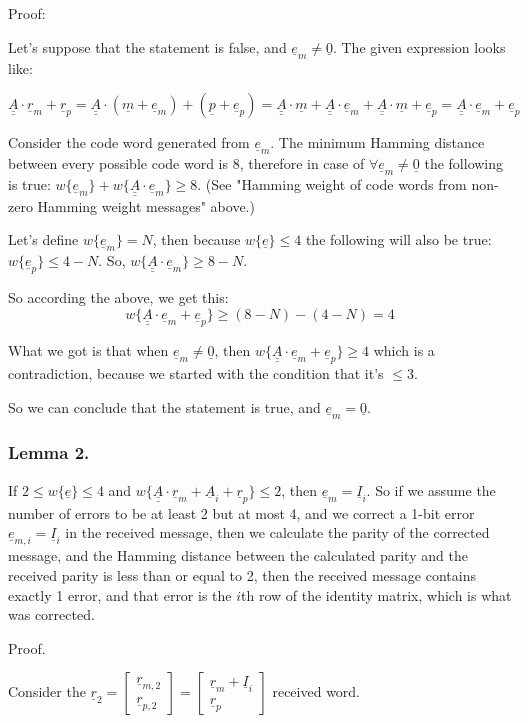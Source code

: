 \documentclass[11pt,a4paper,oneside]{report}             %
\def\doubleunderline#1{\underline{\underline{#1}}}
\def\dul#1{\doubleunderline{#1}}
\def\ul#1{\underline{#1}}
\newcommand{\vect}[2]{\begin{bmatrix} #1 \\ #2 \end{bmatrix}}
\begin{document}
Proof:

Let's suppose that the statement is false, and $\ul{e}_m \neq \ul{0}$.
The given expression looks like:

\[
    \dul{A} \cdot \ul{r}_m + \ul{r}_p =
    \dul{A} \cdot ( \ul{m} + \ul{e}_m ) + ( \ul{p} + \ul{e}_p ) =
    \dul{A} \cdot \ul{m} + \dul{A} \cdot \ul{e}_m + \dul{A} \cdot \ul{m} + \ul{e}_p =
    \dul{A} \cdot \ul{e}_m + \ul{e}_p
\]

Consider the code word generated from $\ul{e}_m$. The minimum Hamming distance between every possible code word is 8, therefore
in case of $\forall \ul{e}_m \neq \ul{0}$ the following is true:
$w\{ \ul{e}_m \} +  w\{ \dul{A} \cdot \ul{e}_m \} \geq 8$.
(See "Hamming weight of code words from non-zero Hamming weight messages" above.)

Let's define $w\{ \ul{e}_m \} = N$, then because $w\{ \ul{e} \} \leq 4$ the following
will also be true: $w\{ \ul{e}_p \} \leq 4 - N$.
So, $w\{ \dul{A} \cdot \ul{e}_m \} \geq 8 - N$.

So according the above, we get this:
\[
    w\{ \dul{A} \cdot \ul{e}_m + \ul{e}_p \} \geq (8 - N) - (4 - N) = 4
\]

What we got is that when $\ul{e}_m \neq \ul{0}$, then
$w\{ \dul{A} \cdot \ul{e}_m + \ul{e}_p \} \geq 4$ which is a contradiction, because
we started with the condition that it's $\leq 3$.

So we can conclude that the statement is true, and $\ul{e}_m = \ul{0}$.

\subsubsection{Lemma 2.}

If $2 \leq w\{\ul{e}\} \leq 4$ and $w\{\dul{A} \cdot \ul{r}_m + \ul{A}_i + \ul{r}_p\} \leq 2$,
then $\ul{e}_m = \ul{I}_i$. So if we assume the number of errors to be at least 2 but at most 4,
and we correct a 1-bit error $\ul{e}_{m, i} = \ul{I}_i$ in the received message, then we calculate
the parity of the corrected message, and the Hamming distance between the calculated parity and
the received parity is less than or equal to 2, then the received message contains exactly 1 error,
and that error is the $i$th row of the identity matrix, which is what was corrected.

Proof.

Consider the $\ul{r}_2 = \vect{\ul{r}_{m,2}}{\ul{r}_{p,2}} = \vect{\ul{r}_m + \ul{I}_i}{\ul{r}_p}$ received word.
\end{document}
